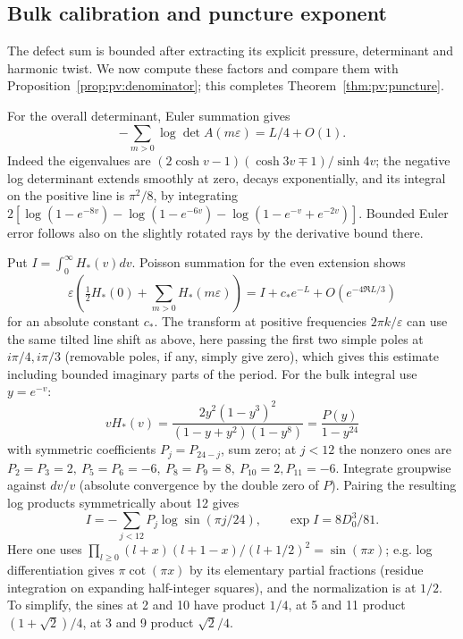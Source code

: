 \subsection{Bulk calibration and puncture exponent}\label{c01-c1-bulk-calibration-and-puncture-exponent}

The defect sum is bounded after extracting its explicit pressure, determinant and harmonic twist. We now compute these factors and compare them with Proposition~\ref{prop:pv:denominator}; this completes Theorem~\ref{thm:pv:puncture}.

For the overall determinant, Euler summation gives
\[
 -\sum_{m>0}\log\det A(m\varepsilon)=L/4+O(1).
\]
Indeed the eigenvalues are \((2\cosh v-1)(\cosh3v\mp1)/\sinh4v\); the negative log determinant extends smoothly at zero, decays exponentially, and its integral on the positive line is \(\pi^2/8\), by integrating
\(2[\log(1-e^{-8v})-\log(1-e^{-6v})-\log(1-e^{-v}+e^{-2v})]\).
Bounded Euler error follows also on the slightly rotated rays by the derivative bound there.

Put \(I=\int_0^\infty H_*(v)dv\). Poisson summation for the even extension shows
\[
 \varepsilon\left(\tfrac12 H_*(0)+\sum_{m>0}H_*(m\varepsilon)\right)
 =I+c_* e^{-L}+O(e^{-4\Re L/3})
\]
for an absolute constant \(c_*\). The transform at positive frequencies \(2\pi k/\varepsilon\) can use the same tilted line shift as above, here passing the first two simple poles at \(i\pi/4,i\pi/3\) (removable poles, if any, simply give zero), which gives this estimate including bounded imaginary parts of the period. For the bulk integral use \(y=e^{-v}\):
\[
 v H_*(v)=\frac{2y^2(1-y^3)^2}{(1-y+y^2)(1-y^8)}
          =\frac{P(y)}{1-y^{24}}
\]
with symmetric coefficients \(P_j=P_{24-j}\), sum zero; at \(j<12\) the nonzero ones are \(P_2=P_3=2,\ P_5=P_6=-6,\ P_8=P_9=8,\ P_{10}=2,P_{11}=-6\). Integrate groupwise against \(dv/v\) (absolute convergence by the double zero of \(P\)). Pairing the resulting log products symmetrically about 12 gives
\[
 I=-\sum_{j<12} P_j\log\sin(\pi j/24),\qquad
 \exp I=8D_0^3/81.
\]
Here one uses \(\prod_{l\ge0}(l+x)(l+1-x)/(l+1/2)^2=\sin(\pi x)\); e.g. log differentiation gives \(\pi\cot(\pi x)\) by its elementary partial fractions (residue integration on expanding half-integer squares), and the normalization is at \(1/2\). To simplify, the sines at 2 and 10 have product \(1/4\), at 5 and 11 product \((1+\sqrt2)/4\), at 3 and 9 product \(\sqrt2/4\).

